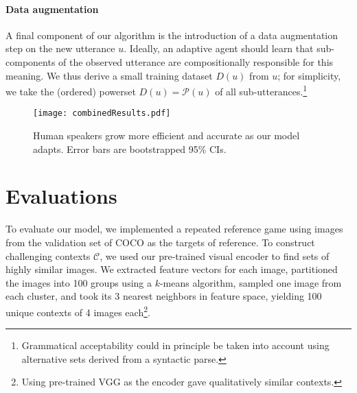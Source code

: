 \paragraph{Data augmentation} A final component of our algorithm is the introduction of a data augmentation step on the new utterance $u$.
Ideally, an adaptive agent should learn that sub-components of the observed utterance are compositionally responsible for this meaning.
We thus derive a small training dataset $D(u)$ from $u$; 
for simplicity, we take the (ordered) powerset $D(u) = \mathcal{P}(u)$ of all sub-utterances.\footnote{Grammatical acceptability could in principle be taken into account using alternative sets derived from a syntactic parse.}

\begin{figure*}[t]
\centering
\texttt{[image: combinedResults.pdf]}
\vspace{-1em}
\caption{Human speakers grow more efficient and accurate as our model adapts. Error bars are bootstrapped 95\% CIs.}
\vspace{-1em}
\label{fig:results}
\end{figure*}

\section{Evaluations}

To evaluate our model, we implemented a repeated reference game using images from the validation set of COCO \cite{lin2014microsoft} as the targets of reference.
To construct challenging contexts $\mathcal{C}$, we used our pre-trained visual encoder to find sets of highly similar images. 
We extracted feature vectors for each image, partitioned the images into 100 groups using a $k$-means algorithm, sampled one image from each cluster, and took its 3 nearest neighbors in feature space, yielding 100 unique contexts of 4 images each\footnote{Using pre-trained VGG as the encoder gave qualitatively similar contexts.}.

